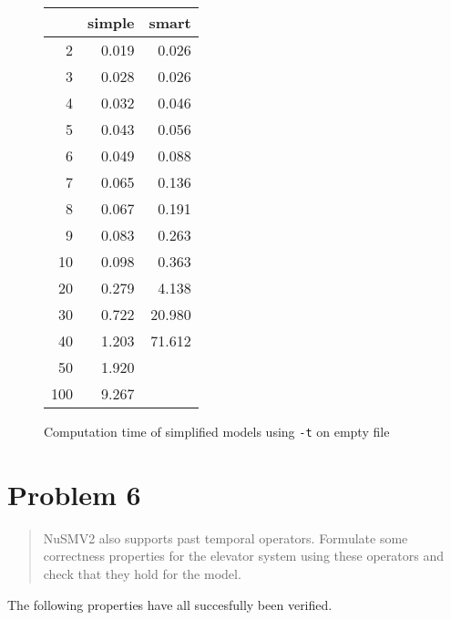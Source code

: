 \documentclass[a4paper,10pt]{article}
\begin{document}
	\begin{figure}[H]
		\begin{center}
			\begin{tabular}{r|r|r}
				\backslashbox{$F$}{$n$} & simple & smart \\ \hline
				2	& 0.019		& 0.026		\\ \hline
				3	& 0.028		& 0.026		\\ \hline
				4	& 0.032		& 0.046		\\ \hline
				5	& 0.043		& 0.056		\\ \hline
				6	& 0.049		& 0.088		\\ \hline 
				7	& 0.065		& 0.136		\\ \hline
				8	& 0.067		& 0.191		\\ \hline
				9	& 0.083		& 0.263		\\ \hline
				10	& 0.098		& 0.363		\\ \hline
				20	& 0.279		& 4.138		\\ \hline
				30	& 0.722		& 20.980	\\ \hline
				40	& 1.203		& 71.612	\\ \hline
				50	& 1.920		&		\\ \hline
				100	& 9.267		&		\\ \hline
			\end{tabular}
		\end{center}
		
		\caption{Computation time of simplified models using \texttt{-t} on empty file}

	\end{figure}
	
	
	\section{Problem 6}
	
	\begin{quote}
		NuSMV2 also supports past temporal operators. Formulate some correctness properties for the elevator system using these operators and check that they hold for the model.
	\end{quote}
	
	The following properties have all succesfully been verified.
	
\end{document}
